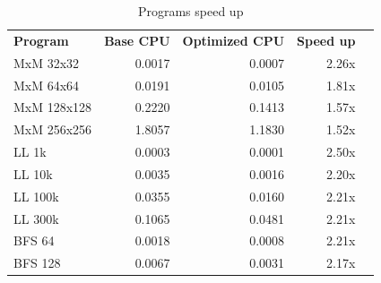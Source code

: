 \documentclass[
	article,			%
	11pt,				%
	oneside,			%
	a4paper,			%
	brazil,				%
        english,			%
	sumario=tradicional
	]{abntex2}
\begin{document}
\begin{table}[]
\caption{Programs speed up}
\label{table:speedup}
\begin{tabular}{|lr|r|r|l}
\cline{1-4}
\multicolumn{1}{|l|}{\textbf{Program}} & \multicolumn{1}{c|}{\textbf{Base CPU}} & \multicolumn{1}{c|}{\textbf{Optimized CPU}} & \multicolumn{1}{c|}{\textbf{Speed up}} &  \\ \cline{1-4}
\multicolumn{1}{|l|}{MxM 32x32}        & 0.0017                                 & 0.0007                                      & 2.26x                                  &  \\ \cline{1-4}
\multicolumn{1}{|l|}{MxM 64x64}        & 0.0191                                 & 0.0105                                      & 1.81x                                  &  \\ \cline{1-4}
\multicolumn{1}{|l|}{MxM 128x128}      & 0.2220                                 & 0.1413                                      & 1.57x                                  &  \\ \cline{1-4}
\multicolumn{1}{|l|}{MxM 256x256}      & 1.8057                                 & 1.1830                                      & 1.52x                                  &  \\ \cline{1-4}
\multicolumn{1}{|l|}{LL 1k}            & 0.0003                                 & 0.0001                                      & 2.50x                                  &  \\ \cline{1-4}
\multicolumn{1}{|l|}{LL 10k}           & 0.0035                                 & 0.0016                                      & 2.20x                                  &  \\ \cline{1-4}
\multicolumn{1}{|l|}{LL 100k}          & 0.0355                                 & 0.0160                                      & 2.21x                                  &  \\ \cline{1-4}
\multicolumn{1}{|l|}{LL 300k}          & 0.1065                                 & 0.0481                                      & 2.21x                                  &  \\ \cline{1-4}
\multicolumn{1}{|l|}{BFS 64}           & 0.0018                                 & 0.0008                                      & 2.21x                                  &  \\ \cline{1-4}
\multicolumn{1}{|l|}{BFS 128}          & 0.0067                                 & 0.0031                                      & 2.17x                                  &  \\ \cline{1-4}

\end{tabular}
\end{table}
\end{document}
